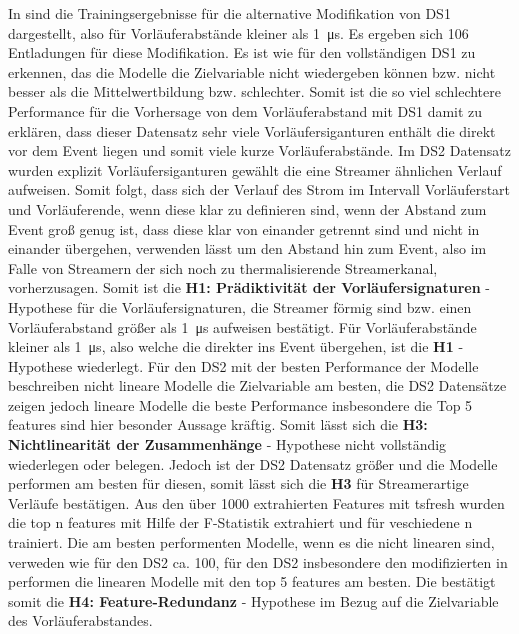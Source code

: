 In  sind die Trainingsergebnisse für die alternative Modifikation von DS1 dargestellt, also für Vorläuferabstände kleiner als \SI{1}{\micro\second}. Es ergeben sich 106 Entladungen für diese Modifikation. Es ist wie für den vollständigen DS1 zu erkennen, das die Modelle die Zielvariable nicht wiedergeben können bzw. nicht besser als die Mittelwertbildung bzw. schlechter. Somit ist die so viel schlechtere Performance für die Vorhersage von dem Vorläuferabstand mit DS1 damit zu erklären, dass dieser Datensatz sehr viele Vorläufersiganturen enthält die direkt vor dem Event liegen und somit viele kurze Vorläuferabstände. Im DS2 Datensatz wurden explizit Vorläufersiganturen gewählt die eine Streamer ähnlichen Verlauf aufweisen. Somit folgt, dass sich der Verlauf des Strom im Intervall Vorläuferstart und Vorläuferende, wenn diese klar zu definieren sind, wenn der Abstand zum Event groß genug ist, dass diese klar von einander getrennt sind und nicht in einander übergehen, verwenden lässt um den Abstand hin zum Event, also im Falle von Streamern der sich noch zu thermalisierende Streamerkanal, vorherzusagen. Somit ist die \textbf{H1: Prädiktivität der Vorläufersignaturen} - Hypothese für die Vorläufersignaturen, die Streamer förmig sind bzw. einen Vorläuferabstand größer als \SI{1}{\micro\second} aufweisen bestätigt. Für Vorläuferabstände kleiner als \SI{1}{\micro\second}, also welche die direkter ins Event übergehen, ist die \textbf{H1} - Hypothese wiederlegt. Für den DS2 mit der besten Performance der Modelle beschreiben nicht lineare Modelle die Zielvariable am besten, die DS2 Datensätze zeigen jedoch lineare Modelle die beste Performance insbesondere die Top 5 features sind hier besonder Aussage kräftig. Somit lässt sich die \textbf{H3: Nichtlinearität der Zusammenhänge} - Hypothese nicht vollständig wiederlegen oder belegen. Jedoch ist der DS2 Datensatz größer und die Modelle performen am besten für diesen, somit lässt sich die \textbf{H3} für Streamerartige Verläufe bestätigen. Aus den über 1000 extrahierten Features mit tsfresh wurden die top n features mit Hilfe der F-Statistik extrahiert und für veschiedene n trainiert. Die am besten performenten Modelle, wenn es die nicht linearen sind, verweden wie für den DS2 ca. 100, für den DS2 insbesondere den modifizierten in  performen die linearen Modelle mit den top 5 features am besten. Die bestätigt somit die \textbf{H4: Feature-Redundanz} - Hypothese im Bezug auf die Zielvariable des Vorläuferabstandes. 


